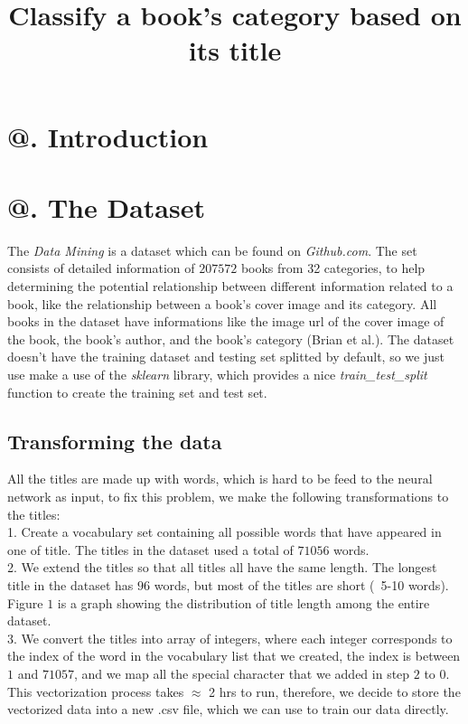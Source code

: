 \documentclass[jou,apacite, 10px]{apa6}
\title{Classify a book's category based on its title}
\makeatletter
\newcommand*{\rom}[1]{\expandafter\@slowromancap\romannumeral #1@}
\makeatother
\begin{document}
\maketitle    
                        
\section{\rom{1}. Introduction}


\section{\rom{2}. The Dataset}
The \textit{Data Mining} is a dataset which can be found on \textit{Github.com}. The set consists of detailed information of $207572$  books from 32 categories, to help determining the potential relationship between different information related to a book, like the relationship between a book's cover image and its category. All books in the dataset have informations like the image url of the cover image of the book, the book's author, and the book's category (Brian et al.). The dataset doesn't have the training dataset and testing set splitted by default, so we just use make a use of the \textit{sklearn} library, which provides a nice \textit{train\_test\_split} function to create the training set and test set.

\subsection{Transforming the data}
All the titles are made up with words, which is hard to be feed to the neural network as input, to fix this problem, we make the following transformations to the titles:\\
1. Create a vocabulary set containing all possible words that have appeared in one of title. The titles in the dataset used a total of $71056$ words.\\
2. We extend the titles so that all titles all have the same length. The longest title in the dataset has $96$ words, but most of the titles are short (~5-10 words). Figure $1$ is a graph showing the distribution of title length among the entire dataset.\\
3. We convert the titles into array of integers, where each integer corresponds to the index of the word in the vocabulary list that we created, the index is between $1$ and $71057$, and we map all the special character that we added in step $2$ to $0$.\\
This vectorization process takes $\approx$ 2 hrs to run, therefore, we decide to store the vectorized data into a new .csv file, which we can use to train our data directly.
\end{document}
